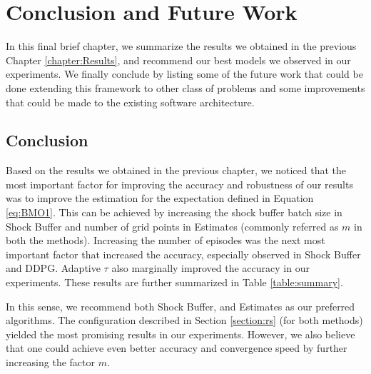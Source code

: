 
\chapter{Conclusion and Future Work}\label{chapter:11_Future_Work}
In this final brief chapter, we summarize the results we obtained in the previous Chapter \ref{chapter:Results}, and recommend our best models we observed in our experiments. We finally conclude by listing some of the future work that could be done extending this framework to other class of problems and some improvements that could be made to the existing software architecture.

\section{Conclusion}


Based on the results we obtained in the previous chapter, we noticed that the most important factor for improving the accuracy and robustness of our results was to improve the estimation for the expectation defined in Equation \ref{eq:BMO1}. This can be achieved by increasing the shock buffer batch size in Shock Buffer and number of grid points in Estimates (commonly referred as $m$ in both the methods). Increasing the number of episodes was the next most important factor that increased the accuracy, especially observed in Shock Buffer and DDPG. Adaptive $\tau$ also marginally improved the accuracy in our experiments.  These results are further summarized in Table \ref{table:summary}.

In this sense, we recommend both Shock Buffer, and Estimates as our preferred algorithms. The configuration described in Section \ref{section:rs} (for both methods) yielded the most promising results in our experiments. However, we also believe that one could achieve even better accuracy and convergence speed by further increasing the factor $m$. 


